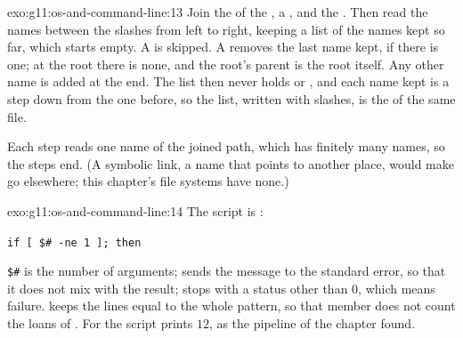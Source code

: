 \begin{solution}{exo:g11:os-and-command-line:13}
Join the  of the , a \code{/}, and the . Then read the names between the
slashes from left to right, keeping a list of the names kept so far, which starts empty. A  is skipped. A
 removes the last name kept, if there is one; at the root there is none, and the root's parent is the root
itself. Any other name is added at the end. The list then never holds  or , and each name kept is a
step down from the one before, so the list, written with slashes, is the  of the same file.

Each step reads one name of the joined path, which has finitely many names, so the steps end. (A symbolic link, a
name that points to another place, would make  go elsewhere; this chapter's file systems have none.)
\end{solution}

\begin{solution}{exo:g11:os-and-command-line:14}
The script is :

\smallskip\noindent\hspace*{2em}\texttt{if [ \$\# -ne 1 ]; then}

\noindent\hspace*{4em}

\noindent\hspace*{4em}

\noindent\hspace*{2em}

\noindent\hspace*{2em}

\smallskip\noindent \texttt{\$\#} is the number of arguments;  sends the message to the standard error, so
that it does not mix with the result;  stops with a status other than $0$, which means failure.
 keeps the lines equal to the whole pattern, so that member  does not count the loans of
. For  the script prints $12$, as the pipeline of the chapter found.
\end{solution}

